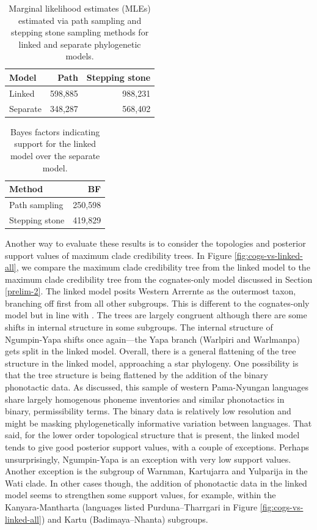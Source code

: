 \documentclass[]{article}
\begin{document}
\begin{table}

\caption{\label{tab:linked-vs-separate-mles}Marginal likelihood estimates (MLEs) estimated via path sampling and stepping stone sampling methods for linked and separate phylogenetic models.}
\centering
\begin{tabular}[t]{lrr}
\toprule
Model & Path & Stepping stone\\
\midrule
Linked & 598,885 & 988,231\\
Separate & 348,287 & 568,402\\
\bottomrule
\end{tabular}
\end{table}

\begin{table}

\caption{\label{tab:linked-vs-separate-bfs}Bayes factors indicating support for the linked model over the separate model.}
\centering
\begin{tabular}[t]{lr}
\toprule
Method & BF\\
\midrule
Path sampling & 250,598\\
Stepping stone & 419,829\\
\bottomrule
\end{tabular}
\end{table}

Another way to evaluate these results is to consider the topologies and posterior support values of maximum clade credibility trees. In Figure \ref{fig:cogs-vs-linked-all}, we compare the maximum clade credibility tree from the linked model to the maximum clade credibility tree from the cognates-only model discussed in Section \ref{prelim-2}. The linked model posits Western Arrernte as the outermost taxon, branching off first from all other subgroups. This is different to the cognates-only model but in line with \textcite{bouckaert_origin_2018}. The trees are largely congruent although there are some shifts in internal structure in some subgroups. The internal structure of Ngumpin-Yapa shifts once again---the Yapa branch (Warlpiri and Warlmanpa) gets split in the linked model. Overall, there is a general flattening of the tree structure in the linked model, approaching a star phylogeny. One possibility is that the tree structure is being flattened by the addition of the binary phonotactic data. As discussed, this sample of western Pama-Nyungan languages share largely homogenous phoneme inventories and similar phonotactics in binary, permissibility terms. The binary data is relatively low resolution and might be masking phylogenetically informative variation between languages. That said, for the lower order topological structure that is present, the linked model tends to give good posterior support values, with a couple of exceptions. Perhaps unsurprisingly, Ngumpin-Yapa is an exception with very low support values. Another exception is the subgroup of Warnman, Kartujarra and Yulparija in the Wati clade. In other cases though, the addition of phonotactic data in the linked model seems to strengthen some support values, for example, within the Kanyara-Mantharta (languages listed Purduna--Tharrgari in Figure \ref{fig:cogs-vs-linked-all}) and Kartu (Badimaya--Nhanta) subgroups.
\end{document}
